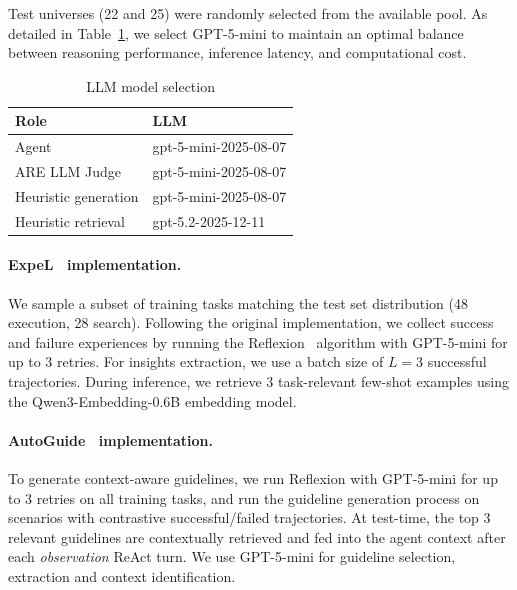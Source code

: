 \documentclass{article}
\begin{document}
Test universes (22 and 25) were randomly selected from the available pool. As detailed in Table~\ref{tab:model_selection}, we select GPT-5-mini to maintain an optimal balance between reasoning performance, inference latency, and computational cost.

\begin{table}[h]
  \centering
  \renewcommand{\arraystretch}{1.3}
  \begin{tabular}{ll}
    \toprule
    \textbf{Role} & \textbf{LLM} \\
    \midrule
    Agent & gpt-5-mini-2025-08-07 \\
    ARE LLM Judge & gpt-5-mini-2025-08-07 \\
    Heuristic generation & gpt-5-mini-2025-08-07 \\
    Heuristic retrieval & gpt-5.2-2025-12-11 \\
    \bottomrule
  \end{tabular}
  \caption{LLM model selection}
  \label{tab:model_selection}
\end{table}

\paragraph{ExpeL~\citep{zhao2024expel} implementation.}

We sample a subset of training tasks matching the test set distribution (48 execution, 28 search). Following the original implementation, we collect success and failure experiences by running the Reflexion~\citep{shinn2023reflexion} algorithm with GPT-5-mini for up to 3 retries. For insights extraction, we use a batch size of $L=3$ successful trajectories. During inference, we retrieve 3 task-relevant few-shot examples using the Qwen3-Embedding-0.6B embedding model.

\paragraph{AutoGuide~\citep{fu2024autoguide} implementation.}
To generate context-aware guidelines, we run Reflexion with GPT-5-mini for up to 3 retries on all training tasks, and run the guideline generation process on scenarios with contrastive successful/failed trajectories. At test-time, the top 3 relevant guidelines are contextually retrieved and fed into the agent context after each \textit{observation} ReAct turn. We use GPT-5-mini for guideline selection, extraction and context identification.
\end{document}
